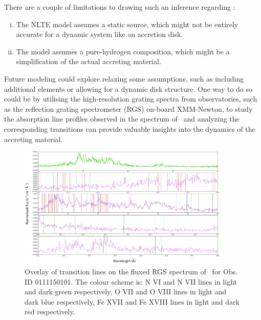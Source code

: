     There are a couple of limitations to drawing such an inference regarding \source:
    \begin{enumerate}[i.]
    	\item The NLTE model assumes a static source, which might not be entirely accurate for a dynamic system like an accretion disk.
    	\item The model assumes a pure-hydrogen composition, which might be a simplification of the actual accreting material.
    \end{enumerate}
    
    Future modeling could explore relaxing some assumptions, such as including additional elements or allowing for a dynamic disk structure. One way to do so could be by utilising the high-resolution grating spectra from observatories, such as the reflection grating spectrometer (RGS) on-board XMM-Newton, to study the absorption line profiles observed in the spectrum of \source\ and analyzing the corresponding transitions can provide valuable insights into the dynamics of the accreting material.
    
    \begin{figure}[!htb]
    	\centering
    	\includegraphics[width=0.9\textwidth]{figures/fig-line_identification-rgs.png}
    	\caption{Overlay of transition lines on the fluxed RGS spectrum of \source\ for Obs. ID 0111150101. The colour scheme is: N VI and N VII lines in light and dark green respectively, O VII and O VIII lines in light and dark blue respectively, Fe XVII and Fe XVIII lines in light and dark red respectively.}
    	\label{fig:rgs-line-overlay}  
    \end{figure}
    
